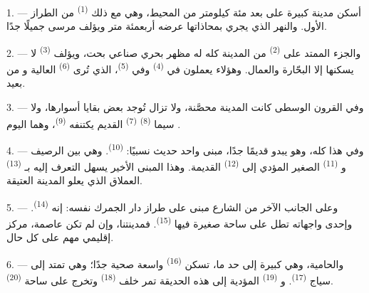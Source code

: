 
\VUsaut{2.0mm}
\VUsaut{3.0mm}
\VUfilet{16mm}
\VUsaut{5.6mm}
\VUsaut{1.4mm}
\VUsaut{2.2mm}

\VUsaut{3.0mm}

1. --- أسكن مدينة كبيرة على بعد مئة كيلومتر من المحيط، وهي مع ذلك
 \textsuperscript{(1)} من الطراز الأول. والنهر الذي يجري بمحاذاتها
عرضه أربعمئة متر ويؤلف مرسى جميلًا جدًا.

2. --- والجزء الممتد على  \textsuperscript{(2)} من المدينة كله له
مظهر بحري صناعي بحت، ويؤلف  \textsuperscript{(3)} لا يسكنها إلا
البحّارة والعمال. وهؤلاء يعملون في  \textsuperscript{(4)} وفي
 \textsuperscript{(5)}، الذي تُرى 
\textsuperscript{(6)} العالية و من بعيد.

3. --- وفي القرون الوسطى كانت المدينة محصَّنة، ولا تزال تُوجد بعض بقايا
أسوارها، ولا سيما  \textsuperscript{(8)} 
\textsuperscript{(7)} القديم يكتنفه  \textsuperscript{(9)}، وهما اليوم
.

4. --- وفي هذا  كله، وهو يبدو قديمًا جدًا، مبنى واحد حديث
نسبيًا:  \textsuperscript{(10)}. وهي بين الرصيف
و \textsuperscript{(11)} الصغير المؤدي إلى 
\textsuperscript{(12)} القديمة. وهذا المبنى الأخير يسهل التعرف إليه
بـ \textsuperscript{(13)} العملاق الذي يعلو المدينة العتيقة.

5. --- وعلى الجانب الآخر من الشارع  مبنى على طراز دار الجمرك
نفسه: إنه  \textsuperscript{(14)}. وإحدى واجهاته تطل على ساحة
صغيرة فيها  \textsuperscript{(15)}. فمدينتنا، وإن لم تكن
عاصمة، مركز إقليمي مهم على كل حال.

\VUsaut{5.0mm}
\VUsaut{3.4mm}

6. --- والحامية، وهي كبيرة إلى حد ما، تسكن  \textsuperscript{(16)}
واسعة صحية جدًا؛ وهي تمتد إلى سياج  \textsuperscript{(17)}.
و \textsuperscript{(19)} المؤدية إلى هذه الحديقة تمر خلف
 \textsuperscript{(18)} وتخرج على ساحة 
\textsuperscript{(20)}.

